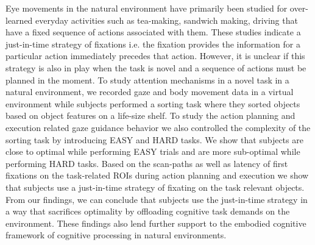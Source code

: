 Eye movements in the natural environment have primarily been studied for over-learned everyday activities such as tea-making, sandwich making, driving that have a fixed sequence of actions associated with them. These studies indicate a just-in-time strategy of fixations i.e. the fixation provides the  information  for  a  particular  action  immediately precedes that action. However, it is unclear if this strategy is also in play when the task is novel and a sequence of actions must be planned in the moment. To study attention mechanisms in a novel task in a natural environment, we recorded gaze and body movement data in a virtual environment while subjects performed a sorting task where they sorted objects based on object features on a life-size shelf. To study the action planning and execution related gaze guidance behavior we also controlled the complexity of the sorting task by introducing EASY and HARD tasks. We show that subjects are close to optimal while performing EASY trials and are more sub-optimal while performing HARD tasks. Based on the scan-paths as well as latency of first fixations on the task-related ROIs during action planning and execution we show that subjects use a just-in-time strategy of fixating on the task relevant objects. From our findings, we can conclude that subjects use the just-in-time strategy in a way that sacrifices optimality by offloading cognitive task demands on the environment. These findings also lend further support to the embodied cognitive framework of cognitive processing in natural environments.